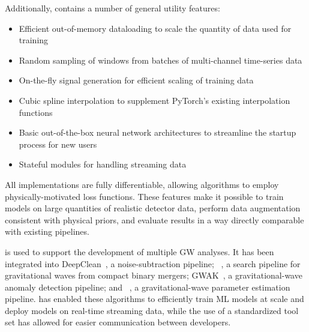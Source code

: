 \begin{refsection}
Additionally, \mlgw contains a number of general utility features:

\begin{itemize}
    \item Efficient out-of-memory dataloading to scale the quantity of data used for training
    \item Random sampling of windows from batches of multi-channel time-series data
    \item On-the-fly signal generation for efficient scaling of training data
    \item Cubic spline interpolation to supplement PyTorch's existing interpolation functions
    \item Basic out-of-the-box neural network architectures to streamline the startup process for new users
    \item Stateful modules for handling streaming data
\end{itemize}

\begin{sloppypar}
All implementations are fully differentiable, allowing algorithms to employ physically-motivated loss functions.
These features make it possible to train models on large quantities of realistic detector data, perform data augmentation consistent with physical priors, and evaluate results in a way directly comparable with existing pipelines.
\end{sloppypar}

\mlgw is used to support the development of multiple GW analyses. 
It has been integrated into DeepClean~\cite{Saleem_2024}, a noise-subtraction pipeline; \aframe~\cite{aframe-methods}, a search pipeline for gravitational waves from compact binary mergers; GWAK~\cite{Raikman:2023ktu}, a gravitational-wave anomaly detection pipeline; and \amplfi~\cite{amplfi}, a gravitational-wave parameter estimation pipeline.
\mlgw has enabled these algorithms to efficiently train ML models at scale and deploy models on real-time streaming data, while the use of a standardized tool set has allowed for easier communication between developers.

\singlespacing
\printbibliography[title=References, heading=subbibintoc]

\end{refsection}